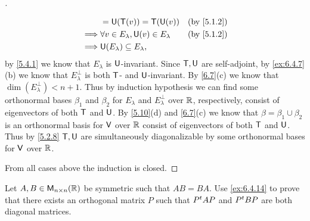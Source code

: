 \begin{proof}[]
\begin{itemize}
\begin{align*}
			               & = \U(\T(v)) = \T(\U(v))                                  &  & \by{5.1.2}    \\
			      \implies & \forall v \in E_{\lambda}, \U(v) \in E_{\lambda}         &  & \by{5.1.2}    \\
			      \implies & \U(E_{\lambda}) \subseteq E_{\lambda},
		      \end{align*}
		      by \cref{5.4.1} we know that \(E_{\lambda}\) is \(\mathsf{U}\)-invariant.
		      Since \(\mathsf{T}, \mathsf{U}\) are self-adjoint, by \cref{ex:6.4.7}(b) we know that \(E_{\lambda}^{\perp}\) is both \(\mathsf{T}\)- and \(\mathsf{U}\)-invariant.
		      By \cref{6.7}(c) we know that \(\dim(E_{\lambda}^{\perp}) < n + 1\).
		      Thus by induction hypothesis we can find some orthonormal bases \(\beta_1\) and \(\beta_2\) for \(E_{\lambda}\) and \(E_{\lambda}^{\perp}\) over \(\mathbb{R}\), respectively, consist of eigenvectors of both \(\mathsf{T}\) and \(\mathsf{U}\).
		      By \cref{5.10}(d) and \cref{6.7}(c) we know that \(\beta = \beta_1 \cup \beta_2\) is an orthonormal basis for \(\mathsf{V}\) over \(\mathbb{R}\) consist of eigenvectors of both \(\mathsf{T}\) and \(\mathsf{U}\).
		      Thus by \cref{5.2.8} \(\mathsf{T}, \mathsf{U}\) are simultaneously diagonalizable by some orthonormal bases for \(\mathsf{V}\) over \(\mathbb{R}\).
	\end{itemize}
	From all cases above the induction is closed.
\end{proof}

\begin{ex}\label{ex:6.4.15}
	Let \(A, B \in \mathsf{M}_{{n} \times n}({\mathbb{R}})\) be symmetric such that \(AB = BA\).
	Use \cref{ex:6.4.14} to prove that there exists an orthogonal matrix \(P\) such that \({P}^{t} A P\) and \({P}^{t} B P\) are both diagonal matrices.
\end{ex}

